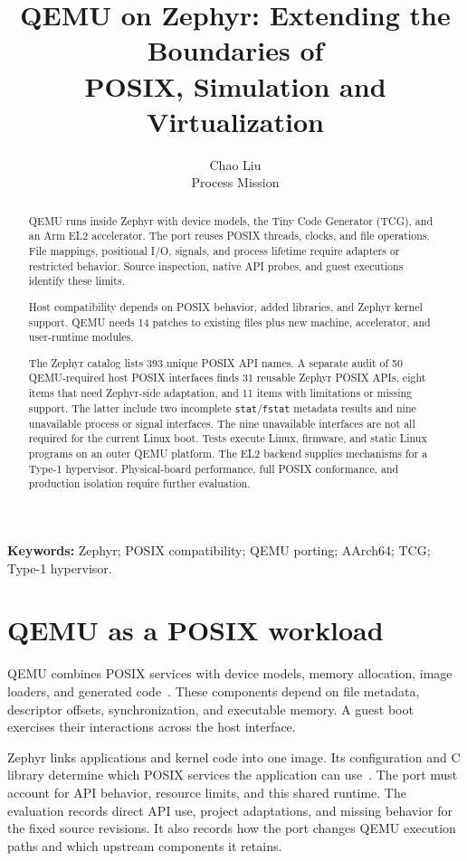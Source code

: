 \documentclass[10pt,a4paper,twocolumn]{article}
\title{\bfseries QEMU on Zephyr: Extending the Boundaries of\\
  POSIX, Simulation and Virtualization}
\author{Chao Liu\\[2pt]\normalsize Process Mission}
\date{}
\newcommand{\code}[1]{\texttt{#1}}
\begin{document}
\maketitle

\begin{abstract}
QEMU runs inside Zephyr with device models, the Tiny Code Generator (TCG),
and an Arm EL2 accelerator. The port reuses POSIX threads, clocks, and file
operations. File mappings, positional I/O, signals, and process lifetime
require adapters or restricted behavior. Source inspection, native API
probes, and guest executions identify these limits.

Host compatibility depends on POSIX behavior, added libraries, and Zephyr
kernel support. QEMU needs 14 patches to existing files plus new machine,
accelerator, and user-runtime modules.

The Zephyr catalog lists 393 unique POSIX API names. A separate audit of 50
QEMU-required host POSIX interfaces finds 31 reusable Zephyr POSIX APIs, eight
items that need Zephyr-side adaptation, and 11 items with limitations or
missing support. The latter include two incomplete \code{stat}/\code{fstat}
metadata results and nine unavailable process or signal interfaces. The nine
unavailable interfaces are not all required for the current Linux boot. Tests execute Linux, firmware, and static
Linux programs on an outer QEMU platform. The EL2 backend supplies mechanisms
for a Type-1 hypervisor. Physical-board performance, full POSIX conformance,
and production isolation require further evaluation.
\end{abstract}

\noindent\textbf{Keywords:} Zephyr; POSIX compatibility; QEMU porting;
AArch64; TCG; Type-1 hypervisor.

\section{QEMU as a POSIX workload}
\label{sec:introduction}

QEMU combines POSIX services with device models, memory allocation, image
loaders, and generated code~\cite{bellard}. These components depend on file
metadata, descriptor offsets, synchronization, and executable memory. A guest
boot exercises their interactions across the host interface.

Zephyr links applications and kernel code into one image. Its configuration
and C library determine which POSIX services the application can
use~\cite{zephyr-posix}. The port must account for API behavior, resource
limits, and this shared runtime. The evaluation records direct API use,
project adaptations, and missing behavior for the fixed source revisions.
It also records how the port changes QEMU execution paths and which upstream
components it retains.
\end{document}
